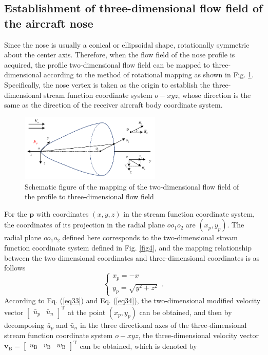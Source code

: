 \subsection{Establishment of three-dimensional flow field of the aircraft nose}
Since the nose is usually a conical or ellipsoidal shape, rotationally symmetric about the center axis. Therefore, when the flow field of the nose profile is acquired, the profile two-dimensional flow field can be mapped to three-dimensional according to the method of rotational mapping as shown in Fig. \ref{fig9}. Specifically, the nose vertex is taken as the origin to establish the three-dimensional stream function coordinate system $o-xyz$, whose direction is the same as the direction of the receiver aircraft body coordinate system. 
\begin{figure}[th]
	\centering
	\includegraphics[width=0.6\textwidth]{Figures/Figs_Ch4/fig9.pdf}
	\caption{Schematic figure of the mapping of the two-dimensional flow field of the profile to three-dimensional flow field}\label{fig9}
\end{figure}\noindent
For the $\mathbf{p}$ with coordinates $(x,y,z)$ in the stream function coordinate system, the coordinates of its projection in the radial plane $oo_1o_2$ are $(x_p,y_p)$. The radial plane $oo_1o_2$ defined here corresponds to the two-dimensional stream function coordinate system defined in Fig. \ref{fig4}, and the mapping relationship between the two-dimensional coordinates and three-dimensional coordinates is as follows
\begin{equation}\label{eq36}
\left\{\begin{array}{l}
x_p=-x \\
y_p=\sqrt{y^2+z^2}
\end{array}\right.\, .
\end{equation}
According to Eq. (\ref{eq33}) and Eq. (\ref{eq34}), the two-dimensional modified velocity vector ${\left[{\begin{array}{*{20}{c}}{{{\bar u}_p}}&{{{\bar u}_n}}\end{array}} \right]^\mathrm{T}}$ at the point $\left( {{x_p},{y_p}} \right)$ can be obtained, and then by decomposing ${\bar u_p}$ and ${\bar u_n}$ in the three directional axes of the three-dimensional stream function coordinate system $o-xyz$, the three-dimensional velocity vector ${\mathbf{v}_\mathrm{B}} = {\left[ {\begin{array}{*{20}{c}}{{u_\mathrm{B}}}&{{v_\mathrm{B}}}&{{w_\mathrm{B}}}\end{array}} \right]^\mathrm{T}}$ can be obtained, which is denoted by
